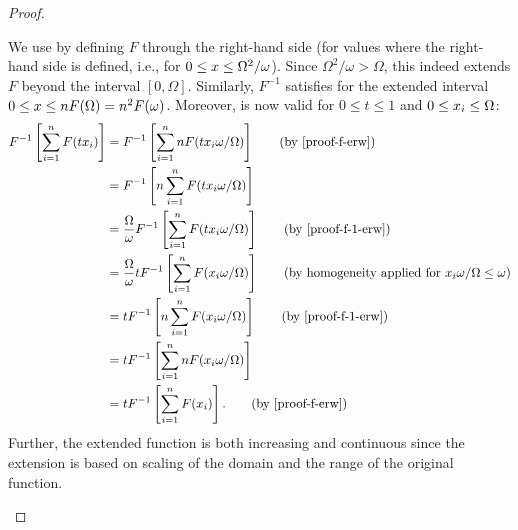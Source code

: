 \begin{proof}
\begin{proofpart}
		We use  by defining $F$ through the right-hand side (for values where the right-hand side is defined, i.e., for $0 \leq x \leq \Omega^2/\omega$). Since $\Omega^2/\omega > \Omega$, this indeed extends $F$ beyond the interval $[0, \Omega]$.
		Similarly, $F^{-1}$ satisfies  for the extended interval $0 \leq x \leq nF(\Omega) = n^2 F(\omega)$.
		Moreover,  is now valid for $0 \leq t \leq 1$ and $0 \leq x_i \leq \Omega$:
		\begin{align*}
			F^{-1} \left[ \sum_{i=1}^{n} F(t \ta_i) \right] & = F^{-1} \left[ \sum_{i=1}^{n} nF(t \ta_i \omega / \Omega) \right] \tag{by \cref{proof-f-erw}}                                                               \\
			                                                & = F^{-1} \left[ n \sum_{i=1}^{n} F(t \ta_i \omega / \Omega) \right]                                                                                          \\
			                                                & = \frac{\Omega}{\omega} F^{-1} \left[ \sum_{i=1}^{n} F(t \ta_i \omega / \Omega) \right] \tag{by \cref{proof-f-1-erw}}                                        \\
			                                                & = \frac{\Omega}{\omega} t F^{-1} \left[ \sum_{i=1}^{n} F(\ta_i \omega / \Omega) \right] \tag{by homogeneity applied for $\ta_i \omega / \Omega \leq \omega$} \\
			                                                & = t F^{-1} \left[ n \sum_{i=1}^{n} F(\ta_i \omega / \Omega) \right] \tag{by \cref{proof-f-1-erw}}                                                            \\
			                                                & = t F^{-1} \left[ \sum_{i=1}^{n} n F(\ta_i \omega / \Omega) \right]                                                                                          \\
			                                                & = t F^{-1} \left[ \sum_{i=1}^{n} F(\ta_i) \right]. \tag{by \cref{proof-f-erw}}
		\end{align*}
		Further, the extended function is both increasing and continuous since the extension is based on scaling of the domain and the range of the original function.


\end{proofpart}
\end{proof}
